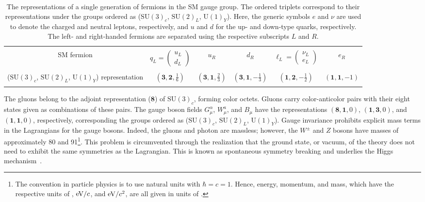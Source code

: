 \begin{table}[!htbp]
	\caption{The representations of a single generation of fermions in the SM gauge group. The ordered triplets correspond to their representations under the groups ordered as ($\mathrm{SU}(3)_c$, $\mathrm{SU}(2)_L$, $\mathrm{U}(1)_Y$). Here, the generic symbols $e$ and $\nu$ are used to denote the charged and neutral leptons, respectively, and $u$ and $d$ for the up- and down-type quarks, respectively. The left- and right-handed fermions are separated using the respective subscripts $L$ and $R$.}
	\centering
	\vspace{\baselineskip}
	\begin{tabular}{cccccc}
		\hline \hline
		\vspace*{-4.0mm} & & & & & \\
		SM fermion & $q_L = \begin{pmatrix} u_L \\ d_L \end{pmatrix}$ & $u_R$ & $d_R$ & $\ell_L = \begin{pmatrix} \nu_L \\ e_L \end{pmatrix}$ & $e_R$ \\
		\vspace*{-4.0mm} & & & & & \\
		\parbox{5cm}{\centering ($\mathrm{SU}(3)_c$, $\mathrm{SU}(2)_L$, $\mathrm{U}(1)_Y$) \\ representation} & $(\mathbf{3},\mathbf{2},\frac{1}{6})$ & $(\mathbf{3},\mathbf{1},\frac{2}{3})$ & $(\mathbf{3},\mathbf{1},-\frac{1}{3})$ & $(\mathbf{1},\mathbf{2},-\frac{1}{2})$ & $(\mathbf{1},\mathbf{1},-1)$ \\
		\vspace*{-4.0mm} & & & & & \\
		\hline \hline
	\end{tabular}
	\label{tab:fermion_representations}
\end{table}

The gluons belong to the adjoint representation ($\mathbf{8}$) of $\mathrm{SU}(3)_c$, forming color octets. Gluons carry color-anticolor pairs with their eight states given as combinations of these pairs. The gauge boson fields $G_{\mu}^{\alpha}$, $W_{\mu}^a$, and $B_{\mu}$ have the representations $(\mathbf{8},\mathbf{1},0)$, $(\mathbf{1},\mathbf{3},0)$, and $(\mathbf{1},\mathbf{1},0)$, respectively, corresponding the groups ordered as ($\mathrm{SU}(3)_c$, $\mathrm{SU}(2)_L$, $\mathrm{U}(1)_Y$). Gauge invariance prohibits explicit mass terms in the Lagrangians for the gauge bosons. Indeed, the gluons and photon are massless; however, the $W^{\pm}$ and $Z$ bosons have masses of approximately 80 and 91\GeV\footnote{The convention in particle physics is to use natural units with $\hbar = c = 1$. Hence, energy, momentum, and mass, which have the respective units of {\eVns}, ${\text{e\hspace{-.08em}V}}/c$, and ${\text{e\hspace{-.08em}V}}/c^2$, are all given in units of {\eVns}.}. This problem is circumvented through the realization that the ground state, or vacuum, of the theory does not need to exhibit the same symmetries as the Lagrangian. This is known as spontaneous symmetry breaking and underlies the Higgs mechanism~\cite{Englert:1964et,Higgs:1964ia,Higgs:1964pj,Guralnik:1964eu,Higgs:1966ev,Kibble:1967sv}.

